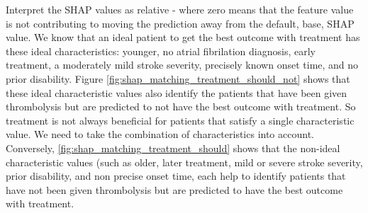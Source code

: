 Interpret the SHAP values as relative - where zero means that the feature value is not contributing to moving the prediction away from the default, base, SHAP value. We know that an ideal patient to get the best outcome with treatment has these ideal characteristics: younger, no atrial fibrilation diagnosis, early treatment,  a moderately mild stroke severity, precisely known onset time, and no prior disability. Figure \ref{fig:shap_matching_treatment_should_not} shows that these ideal characteristic values also identify the patients that have been given thrombolysis but are predicted to not have the best outcome with treatment. So treatment is not always beneficial for patients that satisfy a single characteristic value. We need to take the combination of characteristics into account. Conversely, \ref{fig:shap_matching_treatment_should} shows that the non-ideal characteristic values (such as older, later treatment, mild or severe stroke severity, prior disability, and non precise onset time, each help to identify patients that have not been given thrombolysis but are predicted to have the best outcome with treatment.

